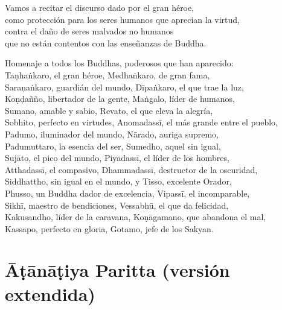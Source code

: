 {\setlength{\parskip}{0pt}%

\begin{soloonechants}
	Vamos a recitar el discurso dado por el gran héroe,\\ como protección para los seres humanos que aprecian la virtud,\\ contra el daño de seres malvados no humanos \\que no están contentos con las enseñanzas de Buddha.
\end{soloonechants}%
}

\vspace*{-2pt}

\englishText

\begin{onechants}
Homenaje a todos los Buddhas, poderosos que han aparecido:\\
Taṇhaṅkaro, el gran héroe, Medhaṅkaro, de gran fama,\\
Saraṇaṅkaro, guardián del mundo, Dīpaṅkaro, el que trae la luz,\\
Koṇḍañño, libertador de la gente, Maṅgalo, líder de humanos,\\
Sumano, amable y sabio, Revato, el que eleva la alegría,\\
Sobhito, perfecto en virtudes, Anomadassī, el más grande entre el pueblo,\\
Padumo, iluminador del mundo, Nārado, auriga supremo,\\
Padumuttaro, la esencia del ser, Sumedho, aquel sin igual,\\
Sujāto, el pico del mundo,  Piyadassī, el líder de los hombres,\\
Atthadassī, el compasivo, Dhammadassī, destructor de la oscuridad,\\
Siddhattho, sin igual en el mundo, y Tisso, excelente Orador,\\
Phusso, un Buddha dador de excelencia, Vipassī, el incomparable,\\
Sikhī, maestro de bendiciones, Vessabhū, el que da felicidad,\\
Kakusandho, líder de la caravana, Koṇāgamano, que abandona el mal,\\
Kassapo, perfecto en gloria, Gotamo, jefe de los Sakyan.\\
\end{onechants}

\clearpage

\chapterTocSubIndentTrue
\chapter{Āṭānāṭiya Paritta (versión extendida)}

